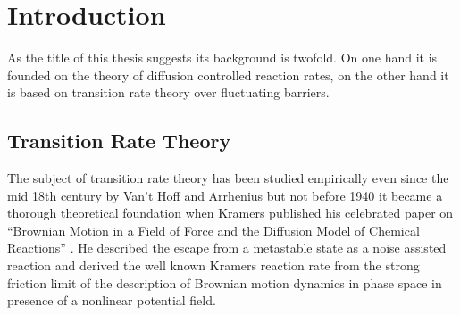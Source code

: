 \setcounter{page}{1}
\chapter{Introduction}

As the title of this thesis suggests its background is twofold. On one hand it is founded on the theory of diffusion controlled reaction rates, on the other hand it is based on transition rate theory over fluctuating barriers. \\

\section{Transition Rate Theory} 

The subject of transition rate theory has been studied empirically even since the mid 18th century by Van't Hoff \cite{hoff1884} and Arrhenius \cite{arrhenius1889} but not before 1940 it became a thorough theoretical foundation when Kramers published his celebrated paper on ``Brownian Motion in a Field of Force and the Diffusion Model of Chemical Reactions'' \cite{Kramers1940}.  He described the escape from a metastable state as a noise assisted reaction and derived the well known Kramers reaction rate from the strong friction limit of the description of Brownian motion dynamics in phase space in presence of a nonlinear potential field.\vspace{- .5 cm} \par

